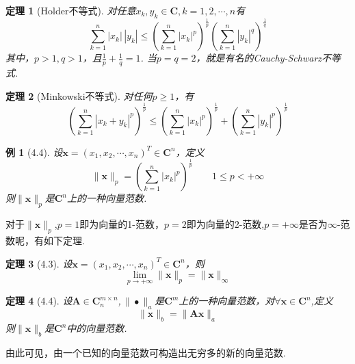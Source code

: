 \documentclass{sintefbeamer}[dark]
\newtheorem*{例}{例}
\newtheorem*{定理}{定理}
\begin{document}
\begin{frame}
	\begin{定理}[Holder不等式]
		对任意$x_{k},y_{k}\in\mathbf{C},k=1,2,\cdots,n$有
		$$
	    \sum_{k=1}^{n}|x_{k}|\,|y_{k}|\le (\sum_{k=1}^{n}|x_{k}|^{p} )^{\frac{1}{p}}(\sum_{k=1}^{n}|y_{k}|^{q} )^{\frac{1}{q} } 
		$$
		\linebreak
		其中，$p>1,q>1$，且$\frac{1}{p}+\frac{1}{q} =1$.
		\pause
		当$p=q=2$，就是有名的Cauchy-Schwarz不等式.
		\end{定理}
\end{frame}

\begin{frame}
	\begin{定理}[Minkowski不等式]
		对任何$p\ge1 $，有
		$$
		(\sum_{k=1}^{n}|x_{k}+y_{k}|^{p} )^{\frac{1}{p} }\le (\sum_{k=1}^{n}|x_{k}|^{p} )^{\frac{1}{p} }+ (\sum_{k=1}^{n}|y_{k}|^{p} )^{\frac{1}{p} }
		$$
		\end{定理}
	\pause
	\begin{例}[4.4]
		设$\bm{x}=(x_{1},x_{2},\cdots,x_{n})^{T}\in\mathbf{C}^{n}$，定义
		$$
		\|\bm{x}\|_{p}=(\sum_{k=1}^{n}|x_{k}|^{p})^{\frac{1}{p}}\qquad 1\le p<+\infty
		$$
		\linebreak
		则$\|\bm{x}\|_{p}$是$\mathbf{C}^{n}$上的一种向量范数.
		\end{例}
	\end{frame}
\begin{frame}
	\qquad
	对于$\|\bm{x}\|_{p}$,$p=1$即为向量的1-范数，$p=2$即为向量的2-范数,$p=+\infty$是否为$\infty$-范数呢，有如下定理.
	\begin{定理}[4.3]
		设$\bm{x}=(x_{1},x_{2},\cdots,x_{n})^{T}\in\mathbf{C}^{n}$，则
		$$
		\lim_{p \to +\infty}\|\bm{x}\|_{p}=\|\bm{x}\|_{\infty}
		$$
		\end{定理}
\end{frame}

	\begin{frame}
		\begin{定理}[4.4]
		设$\mathbf{A}\in\mathbf{C}_{n}^{m\times n}$,$\,\|\bullet\|_{a} $是$\mathbf{C}^{m}$上的一种向量范数，对$\forall\bm{x}\in\mathbf{C}^{n}$,定义
		$$
		\|\bm{x}\|_{b}=\|\bm{A}\bm{x}\|_{a}
		$$
		\linebreak
		则$\|\bm{x}\|_{b}$是$\mathbf{C}^{n}$中的向量范数.
		\end{定理}
	\pause
	由此可见，由一个已知的向量范数可构造出无穷多的新的向量范数.
	\end{frame}
\end{document}
